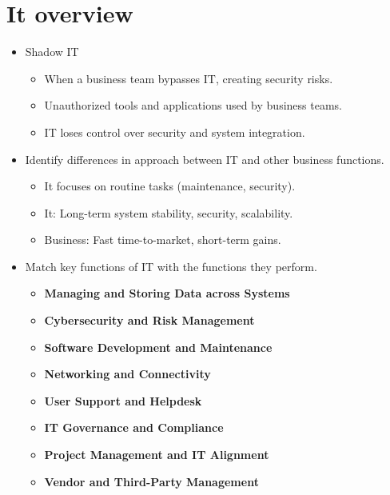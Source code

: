 \documentclass{report}
\begin{document}
\chapter*{It overview}
\begin{itemize}
    \item Shadow IT
        \begin{itemize}[label=$\circ$]
        \item When a business team bypasses IT, creating security risks.
        \item Unauthorized tools and applications used by business teams.
        \item IT loses control over security and system integration.
        \end{itemize}
    \item Identify differences in approach between IT and other business functions.
        \begin{itemize}[label=$\circ$]
            \item It focuses on routine tasks (maintenance, security). 
            \item It: Long-term system stability, security, scalability.
            \item Business: Fast time-to-market, short-term gains.
        \end{itemize}
    \item Match key functions of IT with the functions they perform.
        \begin{itemize}[label=$\circ$]
            \item \textbf{Managing and Storing Data across Systems}
            \item \textbf{Cybersecurity and Risk Management}
            \item \textbf{Software Development and Maintenance}
            \item \textbf{Networking and Connectivity}
            \item \textbf{User Support and Helpdesk}
            \item \textbf{IT Governance and Compliance}
            \item \textbf{Project Management and IT Alignment}
            \item \textbf{Vendor and Third-Party Management}
        \end{itemize}
\end{itemize}
\end{document}
